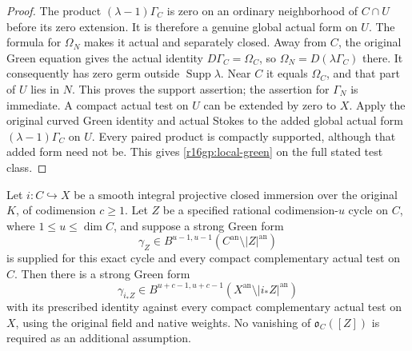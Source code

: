 \begin{proof}
The product $(\lambda-1)\Gamma_C$ is zero on an ordinary
neighborhood of $C\cap U$ before its zero extension.  It is
therefore a genuine global actual form on $U$.  The formula for
$\Omega_N$ makes it actual and separately closed.  Away from $C$,
the original Green equation gives the actual identity
$D\Gamma_C=\Omega_C$, so $\Omega_N=D(\lambda\Gamma_C)$ there.
It consequently has zero germ outside $\operatorname{Supp}\lambda$.
Near $C$ it equals $\Omega_C$, and that part of $U$ lies in $N$.
This proves the support assertion; the assertion for $\Gamma_N$
is immediate.  A compact actual test on $U$ can be extended by
zero to $X$.  Apply the original curved Green identity and actual
Stokes to the added global actual form
$(\lambda-1)\Gamma_C$ on $U$.  Every paired product is compactly
supported, although that added form need not be.  This gives
\eqref{r16gp:local-green} on the full stated test class.
\end{proof}

\begin{theorem}
\label{r16gp:push}
Let $i:C\hookrightarrow X$ be a smooth integral projective closed
immersion over the original $K$, of codimension $c\geq1$.
Let $Z$ be a specified rational codimension-$u$ cycle on $C$,
where $1\leq u\leq\dim C$, and suppose a strong Green form
\[
 \gamma_Z\in B^{u-1,u-1}(C^{\mathrm{an}}\setminus|Z|^{\mathrm{an}})
\]
is supplied for this exact cycle and every compact complementary
actual test on $C$.  Then there is a strong Green form
\[
 \gamma_{i_*Z}\in
 B^{u+c-1,u+c-1}(X^{\mathrm{an}}\setminus|i_*Z|^{\mathrm{an}})
 \tag{GP16.3}\label{r16gp:output}
\]
with its prescribed identity against every compact complementary
actual test on $X$, using the original field and native weights.
No vanishing of $\mathfrak o_C([Z])$ is required as an additional
assumption.
\end{theorem}

